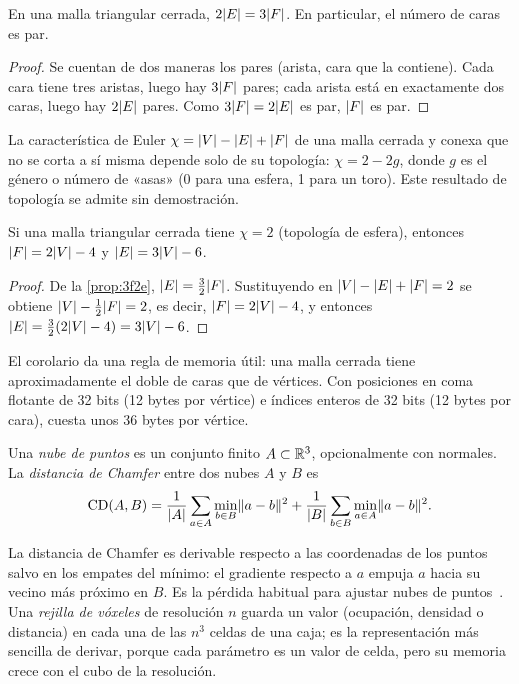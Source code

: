 \begin{proposicion}\label{prop:3f2e}
En una malla triangular cerrada, $2\lvert E\rvert=3\lvert F\rvert$. En particular, el número de caras es par.
\end{proposicion}

\begin{proof}
Se cuentan de dos maneras los pares (arista, cara que la contiene). Cada cara tiene tres aristas, luego hay $3\lvert F\rvert$ pares; cada arista está en exactamente dos caras, luego hay $2\lvert E\rvert$ pares. Como $3\lvert F\rvert=2\lvert E\rvert$ es par, $\lvert F\rvert$ es par.
\end{proof}

La característica de Euler $\chi=\lvert V\rvert-\lvert E\rvert+\lvert F\rvert$ de una malla cerrada y conexa que no se corta a sí misma depende solo de su topología: $\chi=2-2g$, donde $g$ es el género o número de «asas» (0 para una esfera, 1 para un toro). Este resultado de topología se admite sin demostración.

\begin{corolario}\label{cor:euler}
Si una malla triangular cerrada tiene $\chi=2$ (topología de esfera), entonces $\lvert F\rvert=2\lvert V\rvert-4$ y $\lvert E\rvert=3\lvert V\rvert-6$.
\end{corolario}

\begin{proof}
De la \cref{prop:3f2e}, $\lvert E\rvert=\tfrac32\lvert F\rvert$. Sustituyendo en $\lvert V\rvert-\lvert E\rvert+\lvert F\rvert=2$ se obtiene $\lvert V\rvert-\tfrac12\lvert F\rvert=2$, es decir, $\lvert F\rvert=2\lvert V\rvert-4$, y entonces $\lvert E\rvert=\tfrac32(2\lvert V\rvert-4)=3\lvert V\rvert-6$.
\end{proof}

El corolario da una regla de memoria útil: una malla cerrada tiene aproximadamente el doble de caras que de vértices. Con posiciones en coma flotante de 32 bits (12 bytes por vértice) e índices enteros de 32 bits (12 bytes por cara), cuesta unos 36 bytes por vértice.

\begin{definicion}\label{def:chamfer}
Una \emph{nube de puntos} es un conjunto finito $A\subset\mathbb{R}^3$, opcionalmente con normales. La \emph{distancia de Chamfer} entre dos nubes $A$ y $B$ es
\[
\operatorname{CD}(A,B)=\frac{1}{\lvert A\rvert}\sum_{a\in A}\min_{b\in B}\lVert a-b\rVert^2+\frac{1}{\lvert B\rvert}\sum_{b\in B}\min_{a\in A}\lVert a-b\rVert^2 .
\]
\end{definicion}

La distancia de Chamfer es derivable respecto a las coordenadas de los puntos salvo en los empates del mínimo: el gradiente respecto a $a$ empuja $a$ hacia su vecino más próximo en $B$. Es la pérdida habitual para ajustar nubes de puntos~\cite{cmu16825}. Una \emph{rejilla de vóxeles} de resolución $n$ guarda un valor (ocupación, densidad o distancia) en cada una de las $n^3$ celdas de una caja; es la representación más sencilla de derivar, porque cada parámetro es un valor de celda, pero su memoria crece con el cubo de la resolución.

